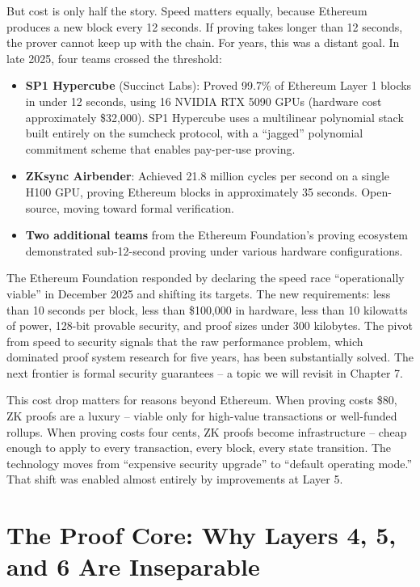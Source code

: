 \documentclass[
  11pt,
  openany]{report}
\renewcommand{\textbf}[1]{{\bfseries\color{MidnightBold}#1}}
\begin{document}
But cost is only half the story. Speed matters equally, because Ethereum
produces a new block every 12 seconds. If proving takes longer than 12 seconds,
the prover cannot keep up with the chain. For years, this was a distant goal. In
late 2025, four teams crossed the threshold:

\begin{itemize}
\item
  \textbf{SP1 Hypercube} (Succinct Labs): Proved 99.7\% of Ethereum Layer 1
  blocks in under 12 seconds, using 16 NVIDIA RTX 5090 GPUs (hardware cost
  approximately \$32,000). SP1 Hypercube uses a multilinear polynomial stack
  built entirely on the sumcheck protocol, with a ``jagged'' polynomial
  commitment scheme that enables pay-per-use proving.
\item
  \textbf{ZKsync Airbender}: Achieved 21.8 million cycles per second on a single
  H100 GPU, proving Ethereum blocks in approximately 35 seconds. Open-source,
  moving toward formal verification.
\item
  \textbf{Two additional teams} from the Ethereum Foundation's proving ecosystem
  demonstrated sub-12-second proving under various hardware configurations.
\end{itemize}

The Ethereum Foundation responded by declaring the speed race ``operationally
viable'' in December 2025 and shifting its targets. The new requirements: less
than 10 seconds per block, less than \$100,000 in hardware, less than 10
kilowatts of power, 128-bit provable security, and proof sizes under 300
kilobytes. The pivot from speed to security signals that the raw performance
problem, which dominated proof system research for five years, has been
substantially solved. The next frontier is formal security guarantees -- a topic
we will revisit in Chapter 7.

This cost drop matters for reasons beyond Ethereum. When proving costs \$80, ZK
proofs are a luxury -- viable only for high-value transactions or well-funded
rollups. When proving costs four cents, ZK proofs become infrastructure -- cheap
enough to apply to every transaction, every block, every state transition. The
technology moves from ``expensive security upgrade'' to ``default operating
mode.'' That shift was enabled almost entirely by improvements at Layer 5.

\section{The Proof Core: Why Layers 4, 5, and 6 Are
Inseparable}\label{the-proof-core-why-layers-4-5-and-6-are-inseparable}
\end{document}
